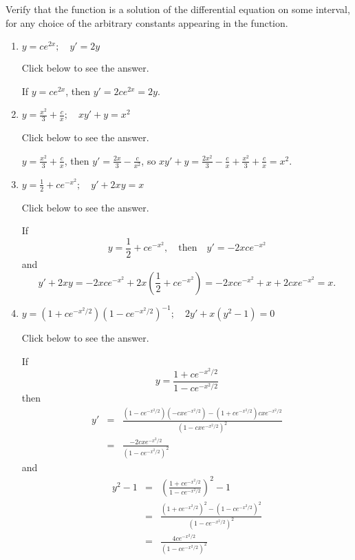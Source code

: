 \documentclass{ximera}
\begin{document}
\begin{problem}\label{exer:1.2.2}
Verify that the  function is a solution of the
differential equation on some interval, for any choice of
the arbitrary constants appearing in the function.

\begin{enumerate}
\item %
 $y=ce^{2x};     \quad y'=2y$

Click below to see the answer.

\begin{expandable}
    If $y=ce^{2x}$, then $y'=2ce^{2x}=2y$.
\end{expandable}
 
\item %
 $y=\frac{x^2}{3}
+\frac{c}{x};   \quad xy'+y=x^2$

Click below to see the answer.

\begin{expandable}
    $y=\frac{x^2}{3}+\frac{c}{x}$, then
$y'=\frac{2x}{3}-\frac{c}{x^2}$, so $xy'+y=\frac{2x^2}{3}-\frac{c}{x
}+\frac{x^2}{3}+\frac{c}{x}=x^2$.
\end{expandable}

\item %
$y=\frac{1}{2}+ce^{-x^2};    \quad y'+2xy=x$

Click below to see the answer.

\begin{expandable}
    If
$$
y=\frac{1}{2}+ce^{-x^2}, \quad \text{then} \quad
y'=-2xce^{-x^2}
$$
and
$$
y'+2xy=-2xce^{-x^2}+2x\left(\frac{1}{2}+ce^{-x^2}\right)
=-2xce^{-x^2}+x+2cxe^{-x^2}=x.
$$
\end{expandable}

\item %
$y=(1+ce^{-x^2/2})(1-ce^{-x^2/2})^{-1};   \quad
2y'+x(y^2-1)=0$

Click below to see the answer.

\begin{expandable}
    If
$$
y=\frac{1+ce^{-x^2/2}}{1-ce^{-x^2/2}}
$$
then
\begin{eqnarray*}
y'&=&\frac{(1-ce^{-x^2/2})(-cxe^{-x^2/2})-(1+ce^{-x^2/2})cxe^{-x^2/2}}{(1-cxe^{-x^2/2})^2}\\
&=&\frac{-2cxe^{-x^2/2}}{(1-ce^{-x^2/2})^2}
\end{eqnarray*}
and
\begin{eqnarray*}
y^2-1&=&\left(\frac{1+ce^{-x^2/2}}{1-ce^{-x^2/2}}\right)^2-1\\
&=&\frac{(1+ce^{-x^2/2})^2-(1-ce^{-x^2/2})^2}{(1-ce^{-x^2/2})^2}\\
&=&\frac{4ce^{-x^2/2}}{(1-ce^{-x^2/2})^2}
\end{eqnarray*}


\end{expandable}
\end{enumerate}
\end{problem}
\end{document}
